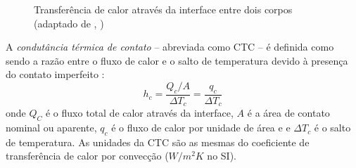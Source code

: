 \begin{figure}[h!b]
\begin{center}
\caption{Transferência de calor através da interface entre dois corpos (adaptado de \citeauthor{livro_ozisik}, \citeyear{livro_ozisik})}
\label{fig1}
\end{center}
\end{figure}

A \textit{condutância térmica de contato} -- abreviada como CTC -- é definida como sendo a razão entre o fluxo de calor e o salto de temperatura
devido à presença do contato imperfeito \citep{livro_madhusudana}:
\begin{equation}
	h_c = \frac{Q_c/A}{\Delta T_c} = \frac{q_c}{\Delta T_c} \label{eq:definicao_1}
\end{equation}
onde $Q_C$ é o fluxo total de calor através da interface, $A$ é a área de contato nominal ou aparente, $q_c$ é o fluxo de calor por unidade de área e e $\Delta T_c$ é o salto de temperatura. As unidades
da CTC são as mesmas do coeficiente de transferência de calor por convecção ($W/m^2 K$ no SI).

